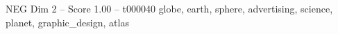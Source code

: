 \begin{textsample}{NEG Dim 2 – Score 1.00 – t000040}  \label{ex:f2_neg_023}
globe, earth, sphere, advertising, science, planet, graphic\_design, atlas

\end{textsample}

